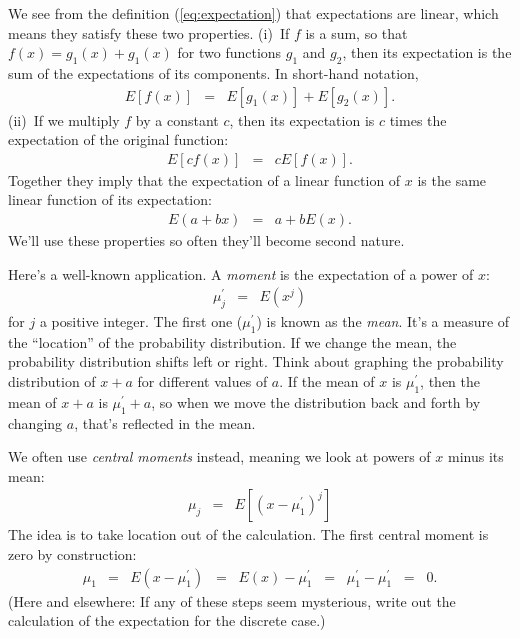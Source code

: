\documentclass[11pt]{article}
\begin{document}
We see from the definition (\ref{eq:expectation}) that expectations are linear,
which means they satisfy these two properties.
(i)~If $f$ is a sum, so that $f(x) = g_1(x) + g_1(x)$ for two functions $g_1$ and $g_2$,
then its expectation is the sum of the expectations of its components.
In short-hand notation,
\begin{eqnarray*}
    E[f(x)] &=& E[g_1(x)] + E[g_2(x)] .
\end{eqnarray*}
(ii)~If we multiply $f$ by a constant $c$, then its expectation is $c$ times
the expectation of the original function:
\begin{eqnarray*}
    E[cf(x)] &=& c E[f(x)] .
\end{eqnarray*}
Together they imply that the expectation of a linear function of $x$
is the same linear function of its expectation:
\begin{eqnarray*}
    E(a + bx) &=& a + b E(x) .
\end{eqnarray*}
We'll use these properties so often they'll become second nature.


Here's a well-known application.
A {\it moment\/} is the expectation of a power of $x$:
\begin{eqnarray*}
    \mu_j^\prime &=& E (x^j)
\end{eqnarray*}
for $j$ a positive integer.
The first one ($\mu_1^\prime$) is known as the {\it mean\/}.
It's a measure of the ``location'' of the probability distribution.
If we change the mean,  the probability distribution shifts left or right.
Think about graphing the probability distribution
of $x+a$ for different values of $a$.
If the mean of $x$ is $\mu^\prime_1$, then the mean of $x+a$ is
$\mu^\prime_1 + a$,
so when we move the distribution back and forth by changing $a$,
that's reflected in the mean.

We often use {\it central moments\/} instead, meaning we look at powers
of $x$ minus its mean:
\begin{eqnarray*}
    \mu_j &=& E [(x-\mu_1^\prime)^j]
\end{eqnarray*}
The idea is to take location out of the calculation.
The first central moment is zero by construction:
\begin{eqnarray*}
    \mu_1 &=& E (x-\mu_1^\prime)
            \;\;=\;\;  E(x) - \mu_1^\prime
            \;\;=\;\;  \mu_1^\prime - \mu_1^\prime  \;\;=\;\; 0.
\end{eqnarray*}
(Here and elsewhere: If any of these steps seem mysterious,
write out the calculation of the expectation for the discrete case.)
\end{document}
